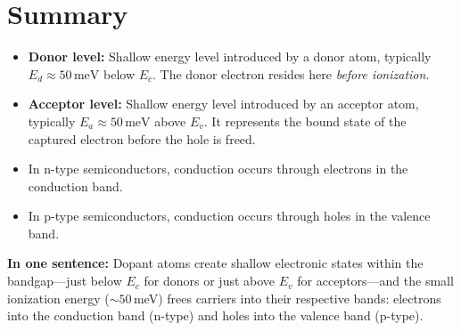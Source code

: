 \documentclass[12pt]{article}
\begin{document}
	\section{Summary}
	\begin{itemize}
		\item \textbf{Donor level:} Shallow energy level introduced by a donor atom, typically \(E_d \approx 50\,\text{meV}\) below \(E_c\). The donor electron resides here \emph{before ionization}.
		\item \textbf{Acceptor level:} Shallow energy level introduced by an acceptor atom, typically \(E_a \approx 50\,\text{meV}\) above \(E_v\). It represents the bound state of the captured electron before the hole is freed.
		\item In n-type semiconductors, conduction occurs through electrons in the conduction band.
		\item In p-type semiconductors, conduction occurs through holes in the valence band.
	\end{itemize}
	
	\noindent
	\textbf{In one sentence:} 
	Dopant atoms create shallow electronic states within the bandgap---just below \(E_c\) for donors or just above \(E_v\) for acceptors---and the small ionization energy ($\sim50$\,meV) frees carriers into their respective bands: electrons into the conduction band (n-type) and holes into the valence band (p-type).
	
\end{document}
